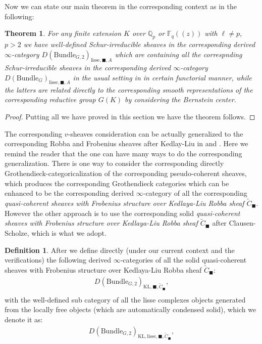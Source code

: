 \documentclass[12pt]{book}
\newtheorem{theorem}{Theorem}
\theoremstyle{definition}
\newtheorem{definition}{Definition}
\begin{document}
Now we can state our main theorem in the corresponding context as in the following:

\begin{theorem}
For any finite extension $K$ over $\mathbb{Q}_p$ or $\mathbb{F}_q((z))$ with $\ell\neq p$, $p>2$ we have well-defined Schur-irreducible sheaves in the corresponding derived $\infty$-category $D(\mathrm{Bundle}_{G,2})_{\text{lisse},\blacksquare,A}$ which are containing all the correspnding Schur-irreducible sheaves in the corresponding derived $\infty$-category $D(\mathrm{Bundle}_{G})_{\text{lisse},\blacksquare,A}$ in the usual setting in \cite{FS} in certain functorial manner, while the latters are related directly to the corresponding smooth representations of the corresponding reductive group $G(K)$ by considering the Bernstein center.
\end{theorem}

\begin{proof}
Putting all we have proved in this section we have the theorem follows.
\end{proof}

\noindent The corresponding $v$-sheaves consideration can be actually generalized to the corresponding Robba and Frobenius sheaves after Kedlay-Liu in \cite{KLII} and \cite{KLI}. Here we remind the reader that the one can have many ways to do the corresponding generalization. There is one way to consider the corresponding directly Grothendieck-categoricalization of the corresponding pseudo-coherent sheaves, which produces the corresponding Grothendieck categories which can be enhanced to be the corresponding derived $\infty$-category of all the corresponding \textit{quasi-coherent sheaves with Frobenius structure over Kedlaya-Liu Robba sheaf $\widetilde{C}_\blacksquare$}. However the other approach is to use the corresponding solid \textit{quasi-coherent sheaves with Frobenius structure over Kedlaya-Liu Robba sheaf $\widetilde{C}_\blacksquare$} after Clausen-Scholze, which is what we adopt.

\begin{definition}
After \cite{FS} we define directly (under our current context and the verifications) the following derived $\infty$-categories of all the solid quasi-coherent sheaves with Frobenius structure over Kedlaya-Liu Robba sheaf $\widetilde{C}_\blacksquare$:
\begin{align}
D(\mathrm{Bundle}_{G,2})_{\text{KL},\blacksquare,\widetilde{C}_\blacksquare},\\
\end{align}
with the well-defined sub category of all the lisse complexes objects generated from the locally free objects (which are automatically condensed solid), which we denote it as:
\begin{align}
D(\mathrm{Bundle}_{G,2})_{\text{KL},\mathrm{lisse},\blacksquare,\widetilde{C}_\blacksquare},\\
\end{align}
\end{definition}
\end{document}
